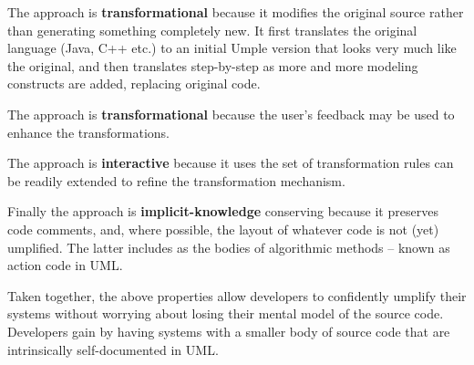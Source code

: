 The approach is \textbf{transformational} because it modifies the original source rather than generating something completely new. It first translates the original language (Java, C++ etc.) to an initial Umple version that looks very much like the original, and then translates step-by-step as more and more modeling constructs are added, replacing original code.

The approach is \textbf{transformational} because the user's feedback may be used to enhance the transformations.

The approach is \textbf{interactive} because it uses the set of transformation rules can be readily extended to refine the transformation mechanism. 

Finally the approach is \textbf{implicit-knowledge} conserving because it preserves code comments, and, where possible, the layout of whatever code is not (yet) umplified. The latter includes as the bodies of algorithmic methods – known as action code in UML.

Taken together, the above properties allow developers to confidently umplify their systems without worrying about losing their mental model of the source code. Developers gain by having systems with a smaller body of source code that are intrinsically self-documented in UML. 

